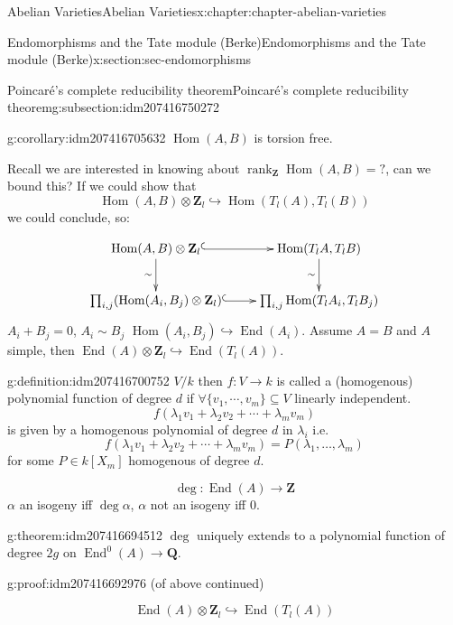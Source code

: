 \documentclass[oneside,10pt,]{book}
\numberwithin{equation}{section}
\newcommand{\lb}{[}
\newcommand{\rb}{]}
\newcommand{\ZZ}{\mathbf{Z}}
\newcommand{\QQ}{\mathbf{Q}}
\DeclareMathOperator{\End}{End}
\DeclareMathOperator{\Hom}{Hom}
\DeclareMathOperator{\rank}{rank}
\begin{document}
\begin{chapterptx}{Abelian Varieties}{}{Abelian Varieties}{}{}{x:chapter:chapter-abelian-varieties}
\begin{sectionptx}{Endomorphisms and the Tate module (Berke)}{}{Endomorphisms and the Tate module (Berke)}{}{}{x:section:sec-endomorphisms}
\begin{subsectionptx}{Poincaré's complete reducibility theorem}{}{Poincaré's complete reducibility theorem}{}{}{g:subsection:idm207416750272}
\begin{corollary}{}{}{g:corollary:idm207416705632}
\(\Hom(A,B)\) is torsion free.%
\end{corollary}
Recall we are interested in knowing about \(\rank_\ZZ\Hom(A,B) = ?\), can we bound this? If we could show that%
\begin{equation*}
\Hom(A,B) \otimes \ZZ_l \hookrightarrow \Hom(T_l(A),T_l(B))
\end{equation*}
we could conclude, so:%
\par
%
\begin{equation*}
\xymatrix{
\Hom(A,B)\otimes \ZZ_l \ar[d]_{\sim} \ar@{^(->}[r]     & \Hom(T_lA,T_lB)\ar[d]_{\sim} \\
\prod_{i,j} (\Hom(A_i, B_j) \otimes \ZZ_l) \ar@{^(->}[r] & \prod_{i,j}\Hom(T_lA_i, T_l B_j)
}
\end{equation*}
\(A_i + B_j = 0\), \(A_i\sim B_j\) \(\Hom(A_i, B_j) \hookrightarrow \End(A_i)\). Assume \(A= B\) and \(A\) simple, then \(\End(A) \otimes \ZZ_l \hookrightarrow \End(T_l(A))\).%
\begin{definition}{}{g:definition:idm207416700752}%
\(V/k\) then \(f\colon V \to k\) is called a (homogenous) polynomial function of degree \(d\) if \(\forall \{v_1,\cdots, v_m\}\subseteq V\) linearly independent.%
\begin{equation*}
f(\lambda_1 v_1 + \lambda_2 v_2 +\cdots + \lambda_m v_m)
\end{equation*}
is given by a homogenous polynomial of degree \(d\) in \(\lambda_i\) i.e.%
\begin{equation*}
f(\lambda_1 v_1 + \lambda_2 v_2 +\cdots + \lambda_m v_m) = P(\lambda_1,\ldots, \lambda_m)
\end{equation*}
for some \(P\in k\lb X_m\rb\) homogenous of degree \(d\).%
\end{definition}
%
\begin{equation*}
\deg\colon \End(A) \to \ZZ
\end{equation*}
\(\alpha\) an isogeny iff \(\deg \alpha\), \(\alpha\) not an isogeny iff \(0\).%
\begin{theorem}{}{}{g:theorem:idm207416694512}%
\(\deg\) uniquely extends to a polynomial function of degree \(2g\) on \(\End^0(A) \to \QQ\).%
\end{theorem}
\begin{proofptx}{}{g:proof:idm207416692976}
(of above continued)%
\par
%
\begin{equation*}
\End(A) \otimes \ZZ_l \hookrightarrow\End(T_l(A))
\end{equation*}

\end{proofptx}
\end{subsectionptx}
\end{sectionptx}
\end{chapterptx}
\end{document}
